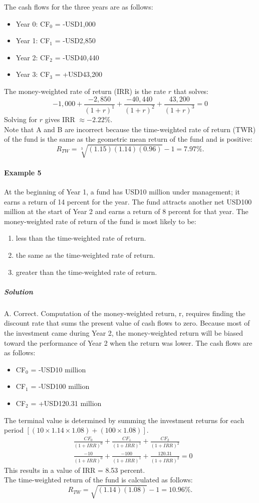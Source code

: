 The cash flows for the three years are as follows:
\begin{itemize}
	\item Year 0: CF$_0$ = -USD1,000
	\item Year 1: CF$_1$ = -USD2,850
	\item Year 2: CF$_2$ = -USD40,440
	\item Year 3: CF$_3$ = +USD43,200
\end{itemize}
The money-weighted rate of return (IRR) is the rate $r$ that solves:
\[
-1,000 + \frac{-2,850}{(1+r)^1} + \frac{-40,440}{(1+r)^2} + \frac{43,200}{(1+r)^3} = 0
\]
Solving for $r$ gives IRR $\approx -2.22\%$.\\
Note that A and B are incorrect because the time-weighted rate of return (TWR) of the fund is the same as the geometric mean return of the fund and is positive:
\[
R_{TW}=\sqrt[3]{(1.15)(1.14)(0.96)} - 1 = 7.97\%.
\]
\paragraph{Example 5} %
At the beginning of Year 1, a fund has USD10 million under management; it earns a return of 14 percent for the year. The fund attracts another net USD100 million at the start of Year 2 and earns a return of 8 percent for that year. The money-weighted rate of return of the fund is most likely to be:
\begin{enumerate}[label=\Alph*.]
	\item less than the time-weighted rate of return.
	\item the same as the time-weighted rate of return.
	\item greater than the time-weighted rate of return.
\end{enumerate}
\subparagraph{Solution} %
A. Correct. Computation of the money-weighted return, r, requires finding the discount rate that sums the present value of cash flows to zero. Because most of the investment came during Year 2, the money-weighted return will be biased toward the performance of Year 2 when the return was lower. The cash flows are as follows:
\begin{itemize}
	\item CF$_0$ = -USD10 million
	\item CF$_1$ = -USD100 million
	\item CF$_2$ = +USD120.31 million
\end{itemize}
The terminal value is determined by summing the investment returns for each period $[(10 \times 1.14 \times 1.08) + (100 \times 1.08)]$.
\begin{align*}
&\frac{CF_0}{(1+IRR)^0} + \frac{CF_1}{(1+IRR)^1} + \frac{CF_2}{(1+IRR)^2} \\
&\frac{-10}{(1+IRR)^0} + \frac{-100}{(1+IRR)^1} + \frac{120.31}{(1+IRR)^2} = 0
\end{align*}
This results in a value of IRR = 8.53 percent.\\
The time-weighted return of the fund is calculated as follows:
\[
R_{TW} = \sqrt{(1.14)(1.08)} - 1 = 10.96\%.
\]

